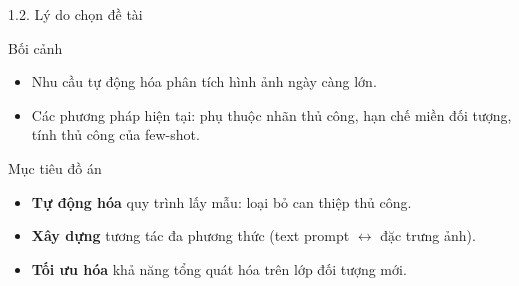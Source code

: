 \documentclass[11pt]{beamer}
\begin{document}
\begin{frame}{1.2. Lý do chọn đề tài}
\scriptsize

\begin{block}{Bối cảnh}
\begin{itemize}
  \item Nhu cầu tự động hóa phân tích hình ảnh ngày càng lớn.
  \item Các phương pháp hiện tại: phụ thuộc nhãn thủ công, hạn chế miền đối tượng, tính thủ công của few-shot.
\end{itemize}
\end{block}

\vspace{0.2cm}

\centering
\renewcommand{\arraystretch}{1.15}
\setlength{\tabcolsep}{4pt}

\vspace{0.3cm}

\begin{block}{Mục tiêu đồ án}
\begin{itemize}
  \item \textbf{Tự động hóa} quy trình lấy mẫu: loại bỏ can thiệp thủ công.
  \item \textbf{Xây dựng} tương tác đa phương thức (text prompt $\leftrightarrow$ đặc trưng ảnh).
  \item \textbf{Tối ưu hóa} khả năng tổng quát hóa trên lớp đối tượng mới.
\end{itemize}
\end{block}

\end{frame}
\end{document}
